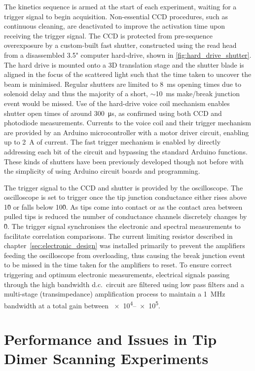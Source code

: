 \documentclass[12pt, a4paper, twoside]{book}
\begin{document}
The kinetics sequence is armed at the start of each experiment, waiting for a trigger signal to begin acquisition. Non-essential CCD procedures, such as continuous cleaning, are deactivated to improve the activation time upon receiving the trigger signal. The CCD is protected from pre-sequence overexposure by a custom-built fast shutter, constructed using the read head from a disassembled 3.5" computer hard-drive, shown in \autoref{fig:hard_drive_shutter}. The hard drive is mounted onto a 3D translation stage and the shutter blade is aligned in the focus of the scattered light such that the time taken to uncover the beam is minimised. Regular shutters are limited to \SI{8}{ms} opening times due to solenoid delay and thus the majority of a short, $\sim$\SI{10}{ms} make/break junction event would be missed. Use of the hard-drive voice coil mechanism enables shutter open times of around \SI{300}{\micro\second}, as confirmed using both CCD and photodiode measurements. Currents to the voice coil and their trigger mechanism are provided by an Arduino microcontroller with a motor driver circuit, enabling up to \SI{2}{A} of current. The fast trigger mechanism is enabled by directly addressing each bit of the circuit and bypassing the standard Arduino functions. These kinds of shutters have been previously developed \cite{maguire2004high, scholten2007enhanced} though not before with the simplicity of using Arduino circuit boards and programming.

The trigger signal to the CCD and shutter is provided by the oscilloscope. The oscilloscope is set to trigger once the tip junction conductance either rises above 1\G0 or falls below 10\G0. As tips come into contact or as the contact area between pulled tips is reduced the number of conductance channels discretely changes by \G0. The trigger signal synchronises the electronic and spectral measurements to facilitate correlation comparisons.
The current limiting resistor described in chapter~\ref{sec:electronic_design} was installed primarily to prevent the amplifiers feeding the oscilloscope from overloading, thus causing the break junction event to be missed in the time taken for the amplifiers to reset.
To ensure correct triggering and optimum electronic measurements, electrical signals passing through the high bandwidth d.c.\ circuit are filtered using low pass filters and a multi-stage (transimpedance) amplification process to maintain a \SI{1}{MHz} bandwidth at a total gain between \num{e4}--\num{e5}.

\FloatBarrier
\section{Performance and Issues in Tip Dimer Scanning Experiments}
\end{document}
